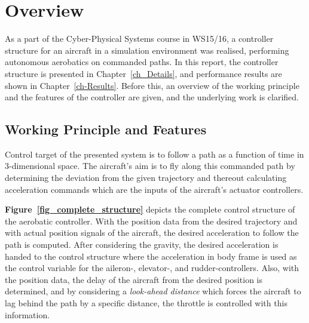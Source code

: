 \documentclass[11pt,a4paper]{scrartcl}		%
\begin{document}


\newpage
	

\section{Overview}

As a part of the Cyber-Physical Systems course in WS15/16, a controller structure for an aircraft in a simulation environment was realised, performing autonomous aerobatics on commanded paths.
In this report, the controller structure is presented in Chapter~\ref{ch_Details}, and performance results are shown in Chapter~\ref{ch-Results}.
Before this, an overview of the working principle and the features of the controller are given, and the underlying work is clarified.

\medskip






\subsection{Working Principle and Features}

Control target of the presented system is to follow a path as a function of time in 3-dimensional space.
The aircraft's aim is to fly along this commanded path by determining the deviation from the given trajectory and thereout calculating acceleration commands which are the inputs of the aircraft's actuator controllers.

\textbf{Figure~\ref{fig_complete_structure}} depicts the complete control structure of the aerobatic controller. 
With the position data from the desired trajectory and with actual position signals of the aircraft, the desired acceleration to follow the path is computed.
After considering the gravity, the desired acceleration is handed to the control structure where the acceleration in body frame is used as the control variable for the aileron-, elevator-, and rudder-controllers.
Also, with the position data, the delay of the aircraft from the desired position is determined, and by considering a \textsl{look-ahead distance} which forces the aircraft to lag behind the path by a specific distance, the throttle is controlled with this information.
\end{document}
